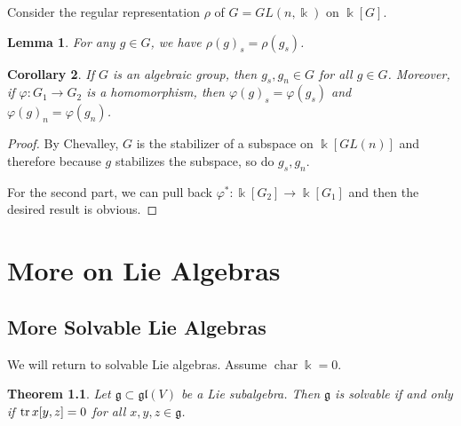 \documentclass[leqno, openany]{memoir}
\newtheorem{thm}{Theorem}[section]
\newtheorem{cor}[thm]{Corollary}
\newtheorem{lem}[thm]{Lemma}
\theoremstyle{definition}
\theoremstyle{remark}
\theoremstyle{plain}
\theoremstyle{definition}
\theoremstyle{remark}
\renewcommand{\k}{\Bbbk}
\newcommand{\mf}[1]{\mathfrak{#1}}
\DeclareMathOperator{\chr}{char}
\begin{document}
Consider the regular representation $\rho$ of $G = GL(n, \k)$ on $\k[G]$.

\begin{lem}
    For any $g \in G$, we have ${\rho(g)}_s = \rho(g_s)$. 
\end{lem}

\begin{cor}
    If $G$ is an algebraic group, then $g_s, g_n \in G$ for all $g \in G$. Moreover, if $\varphi \colon G_1 \to G_2$ is a homomorphism, then ${ \varphi(g) }_s = \varphi(g_s)$ and ${\varphi(g)}_n = \varphi(g_n)$.
\end{cor}

\begin{proof}
    By Chevalley, $G$ is the stabilizer of a subspace on $\k[GL(n)]$ and therefore because $g$ stabilizes the subspace, so do $g_s, g_n$.

    For the second part, we can pull back $\varphi^* \colon \k[G_2] \to \k[G_1]$ and then the desired result is obvious.
\end{proof}

\chapter{More on Lie Algebras}%
\label{cha:more_on_lie_algebras}

\section{More Solvable Lie Algebras}%
\label{sec:more_solvable_lie_algebras}

We will return to solvable Lie algebras. Assume $\chr \k = 0$.

\begin{thm}
    Let $\mf{g} \subset \mf{gl}(V)$ be a Lie subalgebra. Then $\mf{g}$ is solvable if and only if $\trace x[y,z] = 0$ for all $x,y,z \in \mf{g}$.
\end{thm}
\end{document}
